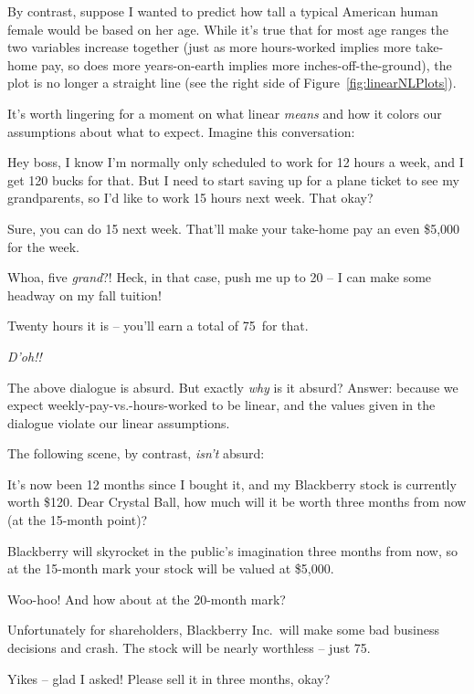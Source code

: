 By contrast, suppose I wanted to predict how tall a typical American human
female would be based on her age. While it's true that for most age ranges the
two variables increase together (just as more hours-worked implies more
take-home pay, so does more years-on-earth implies more inches-off-the-ground),
the plot is no longer a straight line (see the right side of
Figure~\ref{fig:linearNLPlots}).

It's worth lingering for a moment on what linear \textit{means} and how it
colors our assumptions about what to expect. Imagine this conversation:

\begin{dialogue}

 Hey boss, I know I'm normally only scheduled to work for 12 hours a
week, and I get 120 bucks for that. But I need to start saving up for a plane
ticket to see my grandparents, so I'd like to work 15 hours next week. That
okay?

 Sure, you can do 15 next week. That'll make your take-home
pay an even \$5,000 for the week.

  Whoa, five \textit{grand}?! Heck, in that
case, push me up to 20 -- I can make some headway on my fall tuition!

 Twenty hours it is -- you'll earn a total of 75\textcent~for
that.

 \textit{D'oh!!}

\end{dialogue}

The above dialogue is absurd. But exactly \textit{why} is it absurd? Answer:
because we expect weekly-pay-vs.-hours-worked to be linear, and the values
given in the dialogue violate our linear assumptions.

\bigskip
The following scene, by contrast, \textit{isn't} absurd:

\begin{dialogue}

 It's now been 12 months since I bought it, and my Blackberry stock
is currently worth \$120. Dear Crystal Ball, how much will it be worth three
months from now (at the 15-month point)?

 Blackberry will skyrocket in the public's imagination
three months from now, so at the 15-month mark your stock will be valued at
\$5,000.

 Woo-hoo! And how about at the 20-month mark?

 Unfortunately for shareholders, Blackberry Inc.~will make
some bad business decisions and crash. The stock will be nearly worthless --
just 75\textcent.

 Yikes -- glad I asked! Please sell it in three months, okay?

\end{dialogue}

